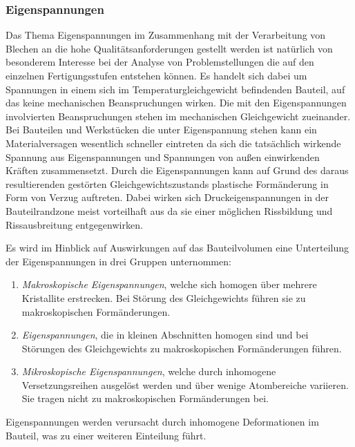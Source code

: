 \documentclass[12pt,a4paper,parskip]{scrartcl}
\begin{document}
{\subsubsection{Eigenspannungen}
Das Thema Eigenspannungen im Zusammenhang mit der Verarbeitung von Blechen an die hohe Qualitätsanforderungen gestellt werden ist natürlich von besonderem Interesse bei der Analyse von Problemstellungen die auf den einzelnen Fertigungsstufen entstehen können. Es handelt sich dabei um Spannungen in einem sich im Temperaturgleichgewicht befindenden Bauteil, auf das keine mechanischen Beanspruchungen wirken. Die mit den Eigenspannungen involvierten  Beanspruchungen stehen im mechanischen Gleichgewicht zueinander. Bei Bauteilen und Werkstücken die unter Eigenspannung stehen kann ein Materialversagen wesentlich schneller eintreten da sich die tatsächlich wirkende Spannung aus Eigenspannungen und Spannungen von außen einwirkenden Kräften zusammensetzt. Durch die Eigenspannungen kann auf Grund des daraus resultierenden gestörten Gleichgewichtszustands plastische Formänderung in Form von Verzug auftreten.
Dabei wirken sich Druckeigenspannungen in der Bauteilrandzone meist vorteilhaft aus da sie einer möglichen Rissbildung und Rissausbreitung entgegenwirken.

Es wird im Hinblick auf Auswirkungen auf das Bauteilvolumen eine Unterteilung der Eigenspannungen in drei Gruppen unternommen:
\begin{enumerate}
\item \emph{Makroskopische Eigenspannungen}, welche sich homogen über mehrere Kristallite erstrecken. Bei Störung des Gleichgewichts führen sie zu makroskopischen Formänderungen.
\item \emph{Eigenspannungen}, die in kleinen Abschnitten homogen sind und bei Störungen des Gleichgewichts zu makroskopischen Formänderungen führen.
\item \emph{Mikroskopische Eigenspannungen}, welche durch inhomogene Versetzungsreihen ausgelöst werden und über wenige Atombereiche variieren. Sie tragen nicht zu makroskopischen Formänderungen bei. 


\end{enumerate}

Eigenspannungen werden verursacht durch inhomogene Deformationen im Bauteil, was zu einer weiteren Einteilung führt.

}
\end{document}
